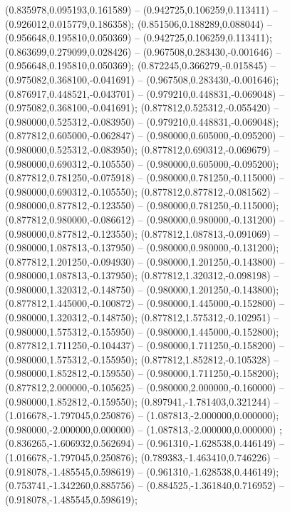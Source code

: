  (0.835978,0.095193,0.161589) -- (0.942725,0.106259,0.113411) -- (0.926012,0.015779,0.186358);
 (0.851506,0.188289,0.088044) -- (0.956648,0.195810,0.050369) -- (0.942725,0.106259,0.113411);
 (0.863699,0.279099,0.028426) -- (0.967508,0.283430,-0.001646) -- (0.956648,0.195810,0.050369);
 (0.872245,0.366279,-0.015845) -- (0.975082,0.368100,-0.041691) -- (0.967508,0.283430,-0.001646);
 (0.876917,0.448521,-0.043701) -- (0.979210,0.448831,-0.069048) -- (0.975082,0.368100,-0.041691);
 (0.877812,0.525312,-0.055420) -- (0.980000,0.525312,-0.083950) -- (0.979210,0.448831,-0.069048);
 (0.877812,0.605000,-0.062847) -- (0.980000,0.605000,-0.095200) -- (0.980000,0.525312,-0.083950);
 (0.877812,0.690312,-0.069679) -- (0.980000,0.690312,-0.105550) -- (0.980000,0.605000,-0.095200);
 (0.877812,0.781250,-0.075918) -- (0.980000,0.781250,-0.115000) -- (0.980000,0.690312,-0.105550);
 (0.877812,0.877812,-0.081562) -- (0.980000,0.877812,-0.123550) -- (0.980000,0.781250,-0.115000);
 (0.877812,0.980000,-0.086612) -- (0.980000,0.980000,-0.131200) -- (0.980000,0.877812,-0.123550);
 (0.877812,1.087813,-0.091069) -- (0.980000,1.087813,-0.137950) -- (0.980000,0.980000,-0.131200);
 (0.877812,1.201250,-0.094930) -- (0.980000,1.201250,-0.143800) -- (0.980000,1.087813,-0.137950);
 (0.877812,1.320312,-0.098198) -- (0.980000,1.320312,-0.148750) -- (0.980000,1.201250,-0.143800);
 (0.877812,1.445000,-0.100872) -- (0.980000,1.445000,-0.152800) -- (0.980000,1.320312,-0.148750);
 (0.877812,1.575312,-0.102951) -- (0.980000,1.575312,-0.155950) -- (0.980000,1.445000,-0.152800);
 (0.877812,1.711250,-0.104437) -- (0.980000,1.711250,-0.158200) -- (0.980000,1.575312,-0.155950);
 (0.877812,1.852812,-0.105328) -- (0.980000,1.852812,-0.159550) -- (0.980000,1.711250,-0.158200);
 (0.877812,2.000000,-0.105625) -- (0.980000,2.000000,-0.160000) -- (0.980000,1.852812,-0.159550);
 (0.897941,-1.781403,0.321244) -- (1.016678,-1.797045,0.250876) -- (1.087813,-2.000000,0.000000);
 (0.980000,-2.000000,0.000000) -- (1.087813,-2.000000,0.000000) ;
 (0.836265,-1.606932,0.562694) -- (0.961310,-1.628538,0.446149) -- (1.016678,-1.797045,0.250876);
 (0.789383,-1.463410,0.746226) -- (0.918078,-1.485545,0.598619) -- (0.961310,-1.628538,0.446149);
 (0.753741,-1.342260,0.885756) -- (0.884525,-1.361840,0.716952) -- (0.918078,-1.485545,0.598619);
